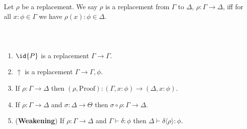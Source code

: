 
Let $\rho$ be a replacement.  We say $\rho$ is a replacement from $\Gamma$ to $\Delta$, $\rho : \Gamma \rightarrow \Delta$,
iff for all $x : \phi \in \Gamma$ we have $\rho(x) : \phi \in \Delta$.

\begin{code}%
\> \AgdaSymbol{:}  \AgdaSymbol{\{}\AgdaSymbol{\}} \AgdaSymbol{\{}\AgdaSymbol{\}}            \<%
\\
\>     \AgdaSymbol{=}     \AgdaSymbol{\{} \AgdaSymbol{=} \AgdaSymbol{\}} \AgdaSymbol{(} \AgdaSymbol{\_} \AgdaSymbol{)}        \<%
\end{code}

\begin{lemma}$ $
\begin{enumerate}
\item
$\id{P}$ is a replacement $\Gamma \rightarrow \Gamma$.
\item
$\uparrow$ is a replacement $\Gamma \rightarrow \Gamma , \phi$.
\item
If $\rho : \Gamma \rightarrow \Delta$ then $(\rho , \mathrm{Proof}) : (\Gamma , x : \phi) \rightarrow (\Delta , x : \phi)$.
\item
If $\rho : \Gamma \rightarrow \Delta$ and $\sigma : \Delta \rightarrow \Theta$ then $\sigma \circ \rho : \Gamma \rightarrow \Delta$.
\item
(\textbf{Weakening})
If $\rho : \Gamma \rightarrow \Delta$ and $\Gamma \vdash \delta : \phi$ then $\Delta \vdash \delta \langle \rho \rangle : \phi$.
\end{enumerate}
\end{lemma}

